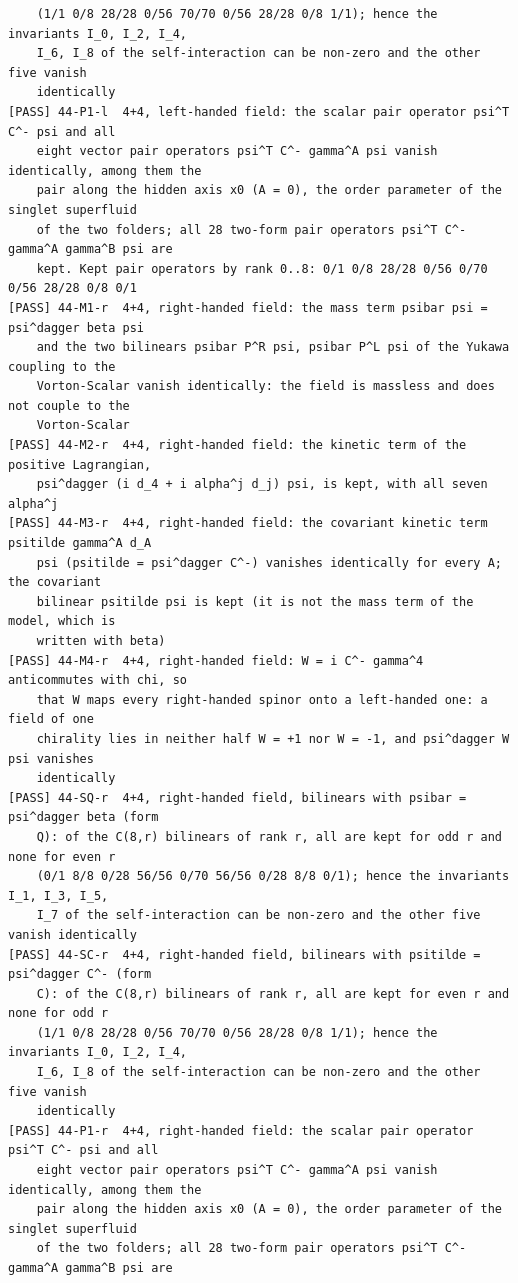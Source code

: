 \documentclass[
  10pt,
]{article}
\begin{document}
\begin{verbatim}
    (1/1 0/8 28/28 0/56 70/70 0/56 28/28 0/8 1/1); hence the invariants I_0, I_2, I_4,
    I_6, I_8 of the self-interaction can be non-zero and the other five vanish
    identically
[PASS] 44-P1-l  4+4, left-handed field: the scalar pair operator psi^T C^- psi and all
    eight vector pair operators psi^T C^- gamma^A psi vanish identically, among them the
    pair along the hidden axis x0 (A = 0), the order parameter of the singlet superfluid
    of the two folders; all 28 two-form pair operators psi^T C^- gamma^A gamma^B psi are
    kept. Kept pair operators by rank 0..8: 0/1 0/8 28/28 0/56 0/70 0/56 28/28 0/8 0/1
[PASS] 44-M1-r  4+4, right-handed field: the mass term psibar psi = psi^dagger beta psi
    and the two bilinears psibar P^R psi, psibar P^L psi of the Yukawa coupling to the
    Vorton-Scalar vanish identically: the field is massless and does not couple to the
    Vorton-Scalar
[PASS] 44-M2-r  4+4, right-handed field: the kinetic term of the positive Lagrangian,
    psi^dagger (i d_4 + i alpha^j d_j) psi, is kept, with all seven alpha^j
[PASS] 44-M3-r  4+4, right-handed field: the covariant kinetic term psitilde gamma^A d_A
    psi (psitilde = psi^dagger C^-) vanishes identically for every A; the covariant
    bilinear psitilde psi is kept (it is not the mass term of the model, which is
    written with beta)
[PASS] 44-M4-r  4+4, right-handed field: W = i C^- gamma^4 anticommutes with chi, so
    that W maps every right-handed spinor onto a left-handed one: a field of one
    chirality lies in neither half W = +1 nor W = -1, and psi^dagger W psi vanishes
    identically
[PASS] 44-SQ-r  4+4, right-handed field, bilinears with psibar = psi^dagger beta (form
    Q): of the C(8,r) bilinears of rank r, all are kept for odd r and none for even r
    (0/1 8/8 0/28 56/56 0/70 56/56 0/28 8/8 0/1); hence the invariants I_1, I_3, I_5,
    I_7 of the self-interaction can be non-zero and the other five vanish identically
[PASS] 44-SC-r  4+4, right-handed field, bilinears with psitilde = psi^dagger C^- (form
    C): of the C(8,r) bilinears of rank r, all are kept for even r and none for odd r
    (1/1 0/8 28/28 0/56 70/70 0/56 28/28 0/8 1/1); hence the invariants I_0, I_2, I_4,
    I_6, I_8 of the self-interaction can be non-zero and the other five vanish
    identically
[PASS] 44-P1-r  4+4, right-handed field: the scalar pair operator psi^T C^- psi and all
    eight vector pair operators psi^T C^- gamma^A psi vanish identically, among them the
    pair along the hidden axis x0 (A = 0), the order parameter of the singlet superfluid
    of the two folders; all 28 two-form pair operators psi^T C^- gamma^A gamma^B psi are

\end{verbatim}
\end{document}
